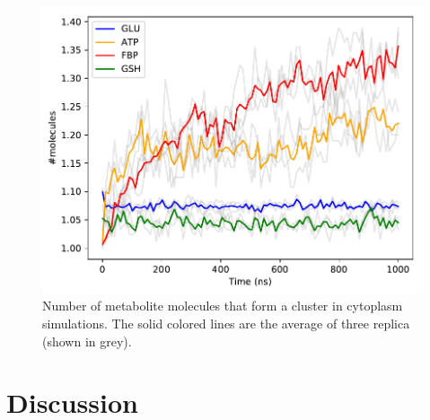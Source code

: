 \documentclass[journal=jacsat,manuscript=article]{achemso}
\begin{document}
\begin{figure}
\includegraphics[scale=0.6]{avclust.pdf}
\caption{Number of metabolite molecules that form a cluster in cytoplasm simulations. The solid colored lines are the average of three replica (shown in grey).}
\end{figure}

 
\section*{Discussion}\label{sec:dissc}
 
\end{document}
